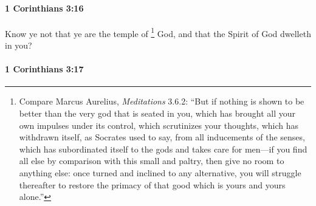 		\paragraph{1 Corinthians 3:16} %
			\label{1CORINTHIANS-3-16}

			Know ye not that ye are the temple of%
				\footnote{%
					Compare Marcus Aurelius, \textit{Meditations} 3.6.2: ``But if nothing is shown to be better than the very god that is seated in you, which has brought all your own impulses under its control, which scrutinizes your thoughts, which has withdrawn itself, as Socrates used to say, from all inducements of the senses, which has subordinated itself to the gods and takes care for men---if you find all else by comparison with this small and paltry, then give no room to anything else: once turned and inclined to any alternative, you will struggle thereafter to restore the primacy of that good which is yours and yours alone.''
					}
			God, and that the Spirit of God dwelleth in you?

			\begin{framed}
			\scriptsize
				\begin{compactdesc}
					\item[SBLG] 
				\end{compactdesc}
			\end{framed}

		\paragraph{1 Corinthians 3:17} %
			\label{1CORINTHIANS-3-17}

